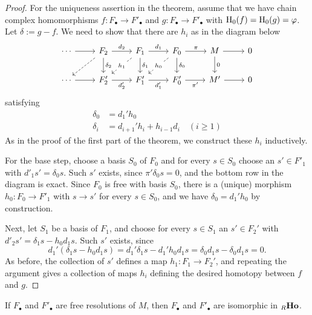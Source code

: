\begin{proof}
 For the uniqueness assertion in the theorem, assume that we have chain complex homomorphisms $f\colon F_\bullet \to F'_\bullet$ and $g\colon F_\bullet \to F'_\bullet$ with ${\mathrm H}_0(f)={\mathrm H}_0(g)=\varphi$. Let $\delta := g-f$. We need to show that there are $h_i$ as in the diagram below
 \[
\begin{tikzcd}
\cdots \arrow{r} & F_2 \arrow{r}{d_2} \arrow{d}{\delta_2} \arrow[dashed]{dl}
	& F_1 \arrow{d}{\delta_1} \arrow{r}{d_1} \arrow[dashed]{dl}[description]{h_1}
	& F_0 \arrow{d}{\delta_0} \arrow{r}{\pi} \arrow[dashed]{dl}[description]{h_0}
	& M \arrow{d}{0} \arrow{r} & 0 \\
\cdots \arrow{r} & F_2' \arrow[swap]{r}{d'_2} 
	& F_1'  \arrow[swap]{r}{d'_1} 
	& F_0' \arrow[swap]{r}{\pi'} 
	& M'  \arrow{r} & 0 
\end{tikzcd}
\]
 satisfying
\begin{align*}
	\delta_0 &= d_1'h_0 \\
	\delta_i &= d_{i+1}'h_i + h_{i-1} d_i \quad (i\geq 1)
\end{align*}
As in the proof of the first part of the theorem, we construct these $h_i$ inductively. 

For the base step,  choose a basis $S_0$ of $F_0$ and for every $s\in S_0$ choose an $s' \in F'_1$ with $d'_1 s' = \delta_0 s$. Such $s'$ exists, since $\pi'\delta_0 s=0$, and the bottom row in the diagram is exact. Since $F_0$ is free with basis $S_0$, there is a (unique) morphism $h_0\colon F_0\to F'_1$ with $s\to s'$ for every $s\in S_0$, and we have $\delta_0 = d_1'h_0$ by  construction.

Next, let $S_1$ be a basis of $F_1$, and choose for every $s\in S_1$ an $s'\in F_2'$ with $d'_2s' = \delta_1s - h_0d_1s$. Such $s'$ exists, since
\[
	d_1'(\delta_1s - h_0d_1s) = d_1'\delta_1 s - d_1'h_0d_1s
	= \delta_0 d_1 s - \delta_0 d_1 s = 0.
\]
As before, the collection of $s'$ defines a map $h_1\colon F_1 \to F_2'$, and repeating the argument gives a collection of maps $h_i$ defining the desired homotopy between $f$ and $g$.
\end{proof}

\begin{corollary}
If $F_\bullet$ and $F'_\bullet$ are free resolutions of $M$, then $F_\bullet$ and $F'_\bullet$ are isomorphic in ${}_R\mathbf{Ho}$.
\end{corollary}

